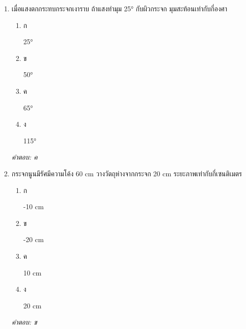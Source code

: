 \documentclass[12pt]{article}
\begin{document}
\begin{enumerate}[label=\arabic*., itemsep=0.5\baselineskip, topsep=0.5\baselineskip, leftmargin=*]
\item เมื่อแสงตกกระทบกระจกเงาราบ ถ้าแสงทำมุม 25° กับผิวกระจก มุมสะท้อนเท่ากับกี่องศา
\begin{enumerate}[label=\alph*)., itemsep=0.3\baselineskip, topsep=0.3\baselineskip]
\item ก\ 
\begin{minipage}[t]{0.9\linewidth}
\raggedright 25°
\end{minipage}
\item ข\ 
\begin{minipage}[t]{0.9\linewidth}
\raggedright 50°
\end{minipage}
\item ค\ 
\begin{minipage}[t]{0.9\linewidth}
\raggedright 65°
\end{minipage}
\item ง\ 
\begin{minipage}[t]{0.9\linewidth}
\raggedright 115°
\end{minipage}
\end{enumerate}
\vspace{-0.3\baselineskip}
\begin{small}
\textit{คำตอบ: ค}
\end{small}

\item กระจกนูนมีรัศมีความโค้ง 60 cm วางวัตถุห่างจากกระจก 20 cm ระยะภาพเท่ากับกี่เซนติเมตร
\begin{enumerate}[label=\alph*)., itemsep=0.3\baselineskip, topsep=0.3\baselineskip]
\item ก\ 
\begin{minipage}[t]{0.9\linewidth}
\raggedright -10 cm
\end{minipage}
\item ข\ 
\begin{minipage}[t]{0.9\linewidth}
\raggedright -20 cm
\end{minipage}
\item ค\ 
\begin{minipage}[t]{0.9\linewidth}
\raggedright 10 cm
\end{minipage}
\item ง\ 
\begin{minipage}[t]{0.9\linewidth}
\raggedright 20 cm
\end{minipage}
\end{enumerate}
\vspace{-0.3\baselineskip}
\begin{small}
\textit{คำตอบ: ข}
\end{small}


\end{enumerate}
\end{document}
